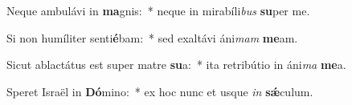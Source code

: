\item Neque ambulávi in \textbf{ma}gnis:~* neque in mirabíli\textit{bus} \textbf{su}per me.
\item Si non humíliter senti\textbf{é}bam:~* sed exaltávi áni\textit{mam} \textbf{me}am.
\item Sicut ablactátus est super matre \textbf{su}a:~* ita retribútio in áni\textit{ma} \textbf{me}a.
\item Speret Israël in \textbf{Dó}mino:~* ex hoc nunc et usque \textit{in} \textbf{sǽ}culum.
